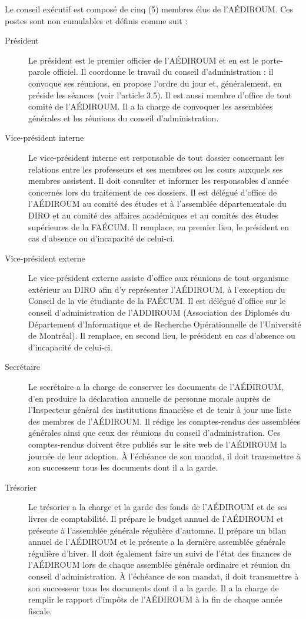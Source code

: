 \documentclass[12pt]{article}
\begin{document}
Le conseil exécutif est composé de cinq (5) membres élus de l'AÉDIROUM. Ces postes sont non cumulables et définis comme suit :
\begin{description}
\item[Président] Le président est le premier officier de l'AÉDIROUM et en est le porte-parole officiel. Il coordonne le travail du conseil d'administration : il convoque ses réunions, en propose l'ordre du jour et, généralement, en préside les séances (voir l'article 3.5). Il est aussi membre d'office de tout comité de l'AÉDIROUM. Il a la charge de convoquer les assemblées générales et les réunions du conseil d'administration.
\item[Vice-président interne] Le vice-président interne est responsable de tout dossier concernant les relations entre les professeurs et ses membres ou les cours auxquels ses membres assistent. Il doit consulter et informer les responsables d'année concernés lors du traitement de ces dossiers. Il est délégué d'office de l'AÉDIROUM au comité des études et à l'assemblée départementale du DIRO et au comité des affaires académiques et au comités des études supérieures de la FAÉCUM. Il remplace, en premier lieu, le président en cas d'absence ou d'incapacité de celui-ci.
\item[Vice-président externe] Le vice-président externe assiste d'office aux réunions de tout organisme extérieur au DIRO afin d'y représenter l'AÉDIROUM, à l'exception du Conseil de la vie étudiante de la FAÉCUM. Il est délégué d'office sur le conseil d'administration de l'ADDIROUM (Association des Diplomés du Département d'Informatique et de Recherche Opérationnelle de l'Université de Montréal). Il remplace, en second lieu, le président en cas d'absence ou d'incapacité de celui-ci.
\item[Secrétaire] Le secrétaire a la charge de conserver les documents de l'AÉDIROUM, d'en produire la déclaration annuelle de personne morale auprès de l'Inspecteur général des institutions financièse et de tenir à jour une liste des membres de l'AÉDIROUM. Il rédige les comptes-rendus des assemblées générales ainsi que ceux des réunions du conseil d'administration. Ces comptes-rendus doivent être publiés sur le site web de l'AÉDIROUM la journée de leur adoption. À l'échéance de son mandat, il doit transmettre à son successeur tous les documents dont il a la garde.
\item[Trésorier] Le trésorier a la charge et la garde des fonds de l'AÉDIROUM et de ses livres de comptabilité. 
Il prépare le budget annuel de l'AÉDIROUM et présente à l'assemblée générale régulière d'automne. Il prépare un 
bilan annuel de l'AÉDIROUM et le présente a la dernière assemblée générale régulière d'hiver. Il doit également 
faire un suivi de l'état des finances de l'AÉDIROUM lors de chaque assemblée générale ordinaire et réunion du 
conseil d'administration. À l'échéance de son mandat, il doit transmettre à son successeur tous les documents 
dont il a la garde. Il a la charge de remplir le rapport d'impôts de l'AÉDIROUM à la fin de chaque année fiscale.
\end{description}
\end{document}
